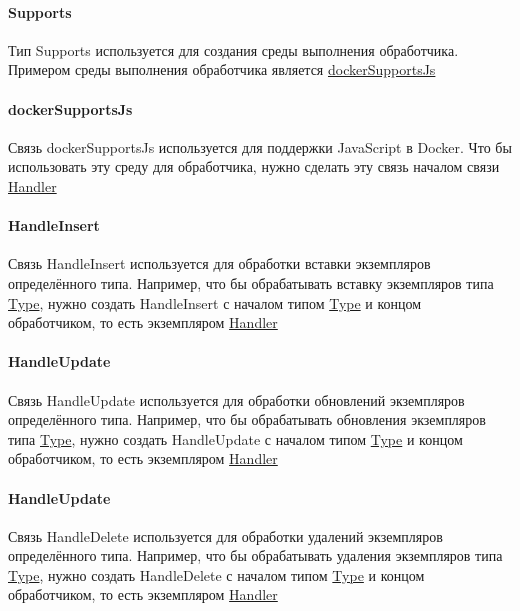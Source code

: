 \documentclass{article}
\begin{document}
\paragraph*{Supports}\hypertarget{Core.Supports.Description}{}
Тип Supports используется для создания среды
выполнения обработчика. Примером среды выполнения обработчика является
\hyperlink{Core.dockerSupportsJs.Description}{dockerSupportsJs}
\paragraph*{dockerSupportsJs}\hypertarget{Core.dockerSupportsJs.Description}{}
Связь dockerSupportsJs используется для
поддержки JavaScript в Docker. Что бы использовать эту среду для обработчика,
нужно сделать эту связь началом связи \hyperlink{Core.Handler.Description}{Handler}
\paragraph*{HandleInsert}\hypertarget{Core.HandleInsert.Description}{}
Связь HandleInsert используется для обработки
вставки экземпляров определённого типа. Например, что бы обрабатывать вставку
экземпляров типа \hyperlink{Core.Type.Description}{Type}, нужно создать HandleInsert с
началом типом \hyperlink{Core.Type.Description}{Type} и концом обработчиком, то есть
экземпляром \hyperlink{Core.Handler.Description}{Handler}
\paragraph*{HandleUpdate}\hypertarget{Core.HandleUpdate.Description}{}
Связь HandleUpdate используется для обработки
обновлений экземпляров определённого типа. Например, что бы обрабатывать
обновления экземпляров типа \hyperlink{Core.Type.Description}{Type}, нужно создать
HandleUpdate с началом типом \hyperlink{Core.Type.Description}{Type} и концом обработчиком,
то есть экземпляром \hyperlink{Core.Handler.Description}{Handler}
\paragraph*{HandleUpdate}\hypertarget{Core.HandleDelete.Description}{}
Связь HandleDelete используется для обработки
удалений экземпляров определённого типа. Например, что бы обрабатывать удаления
экземпляров типа \hyperlink{Core.Type.Description}{Type}, нужно создать HandleDelete с
началом типом \hyperlink{Core.Type.Description}{Type} и концом обработчиком, то есть
экземпляром \hyperlink{Core.Handler.Description}{Handler}
\end{document}
